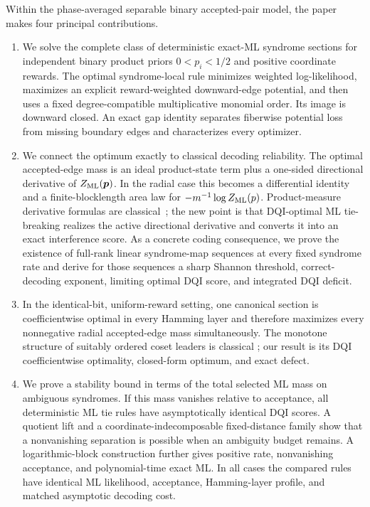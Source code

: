 \documentclass[journal]{IEEEtran}
\theoremstyle{definition}
\theoremstyle{remark}
\begin{document}
Within the phase-averaged separable binary accepted-pair model, the paper
makes four principal contributions.

\begin{enumerate}
\item We solve the complete class of deterministic exact-ML syndrome sections
for independent binary product priors $0<p_i<1/2$ and positive coordinate
rewards.  The optimal syndrome-local rule minimizes weighted log-likelihood,
maximizes an explicit reward-weighted downward-edge potential, and then uses a
fixed degree-compatible multiplicative monomial order.  Its image is downward
closed.  An exact gap identity separates fiberwise potential loss from missing
boundary edges and characterizes every optimizer.

\item We connect the optimum exactly to classical decoding reliability.  The
optimal accepted-edge mass is an ideal product-state term plus a one-sided
directional derivative of $Z_{\rm ML}(\boldsymbol p)$.  In the radial case this
becomes a differential identity and a finite-blocklength area law for
$-m^{-1}\log Z_{\rm ML}(p)$.  Product-measure derivative formulas are
classical~\cite{margulis1974,russo1981}; the new point is that DQI-optimal ML
  tie-breaking realizes the active directional derivative and converts it into
  an exact interference score.  As a concrete coding consequence, we prove the
  existence of full-rank linear syndrome-map sequences at every fixed syndrome rate and
  derive for those sequences a sharp Shannon threshold, correct-decoding exponent, limiting
optimal DQI score, and integrated DQI deficit.

\item In the identical-bit, uniform-reward setting, one canonical section is
coefficientwise optimal in every Hamming layer and therefore maximizes every
nonnegative radial accepted-edge mass simultaneously.  The monotone structure
of suitably ordered coset leaders is classical
\cite{helleseth2005,yasunaga2010,borges2010coset,borges2012leaders}; our result
is its DQI coefficientwise optimality, closed-form optimum, and exact defect.

\item We prove a stability bound in terms of the total selected ML mass on
ambiguous syndromes.  If this mass vanishes relative to acceptance, all
deterministic ML tie rules have asymptotically identical DQI scores.  A
  quotient lift and a coordinate-indecomposable fixed-distance family show that
  a nonvanishing separation is possible when an ambiguity budget remains.  A
  logarithmic-block construction further gives positive rate, nonvanishing
  acceptance, and polynomial-time exact ML.  In all cases the compared rules
  have identical ML likelihood, acceptance, Hamming-layer profile, and matched
  asymptotic decoding cost.
\end{enumerate}
\end{document}
